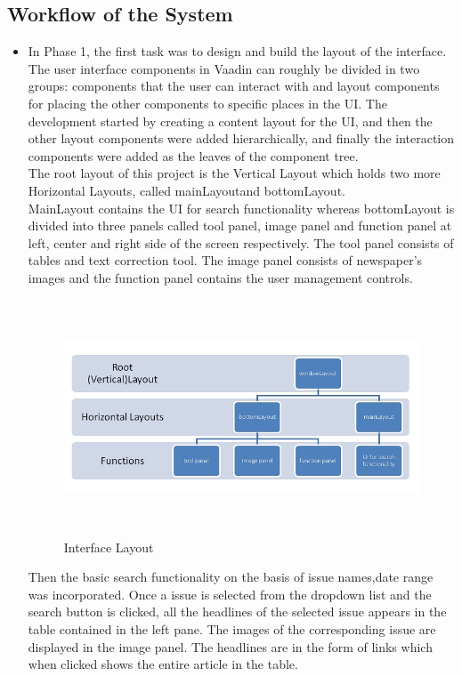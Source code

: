 \documentclass[12pt]{article}
\begin{document}
\subsection{Workflow of the System}
\begin{itemize}
    \item In Phase 1, the first task was to design and build the layout of the interface. The user interface components in Vaadin can roughly be divided in two groups: components that the user can interact with and layout components for placing the other components to specific places in the UI. The development started by creating a content layout for the UI, and then the other layout components were added hierarchically, and finally the interaction components were added as the leaves of the component tree.\\

The root layout of this project is the Vertical Layout which holds two more Horizontal Layouts, called \textgravedbl mainLayout\textasciidieresis and \textgravedbl bottomLayout\textasciidieresis.\\
MainLayout contains the UI for search functionality whereas bottomLayout is divided into three panels called tool panel, image panel and function panel at left, center and right side of the screen respectively. The tool panel consists of tables and text correction tool. The image panel consists of newspaper's images and the function panel contains the user management controls.\\

\begin{figure}[ht!]
\centering
\includegraphics[width=14cm,height=7cm]{layouts.jpg}
\caption{Interface Layout}
\label{fig:1}
\end{figure}

Then the basic search functionality on the basis of issue names,date range was incorporated. Once a issue is selected from the dropdown list and the search button is clicked, all the headlines of the selected issue appears in the table contained in the left pane. The images of the corresponding issue are displayed in the image panel. The headlines are in the form of links which when clicked shows the entire article in the table.


\end{itemize}
\end{document}
